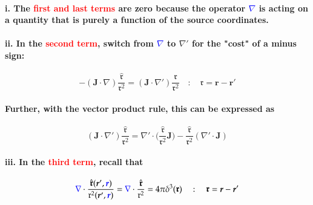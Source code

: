 \documentclass{article}
\begin{document}
\paragraph{\indent\indent i. The \textcolor{red}{first and last terms} are zero because the operator \textcolor{blue}{$\nabla$} is acting on a quantity that is purely a function of the source coordinates.}
\paragraph{\indent\indent ii. In the \textcolor{red}{second term}, switch from \textcolor{blue}{$\nabla$} to $\nabla'$ for the "cost" of a minus sign:}
\begin{equation*}
    -(\boldsymbol{J}\cdot\nabla)\frac{\hat{\boldsymbol{\mathfrak{r}}}}{\mathfrak{r}^2}=(\boldsymbol{J}\cdot\nabla')\frac{\hat{\boldsymbol{\mathfrak{r}}}}{\mathfrak{r}^2}\quad:\quad \boldsymbol{\mathfrak{r}}=\boldsymbol{r}-\boldsymbol{r}'
\end{equation*}
\paragraph{Further, with the vector product rule, this can be expressed as}
\begin{equation*}
    (\boldsymbol{J}\cdot\nabla')\frac{\hat{\boldsymbol{\mathfrak{r}}}}{\mathfrak{r}^2}=\nabla'\cdot\bigg(\frac{\hat{\boldsymbol{\mathfrak{r}}}}{\mathfrak{r}^2}\boldsymbol{J}\bigg)-\frac{\hat{\boldsymbol{\mathfrak{r}}}}{\mathfrak{r}^2}(\nabla'\cdot\boldsymbol{J})
\end{equation*}
\paragraph{\indent\indent iii. In the \textcolor{red}{third term}, recall that }
\begin{equation*}
    \textcolor{blue}{\nabla}\cdot\frac{\hat{\boldsymbol{\mathfrak{r}}}(\boldsymbol{r}',\textcolor{blue}{\boldsymbol{r}})}{\mathfrak{r}^2(\boldsymbol{r}',\textcolor{blue}{\boldsymbol{r}})}=\textcolor{blue}{\nabla}\cdot\frac{\hat{\boldsymbol{\mathfrak{r}}}}{\mathfrak{r}^2}=4\pi\delta^3(\boldsymbol{\mathfrak{r}})\quad:\quad \boldsymbol{\mathfrak{r}}=\boldsymbol{r}-\boldsymbol{r}'
\end{equation*}
\end{document}
